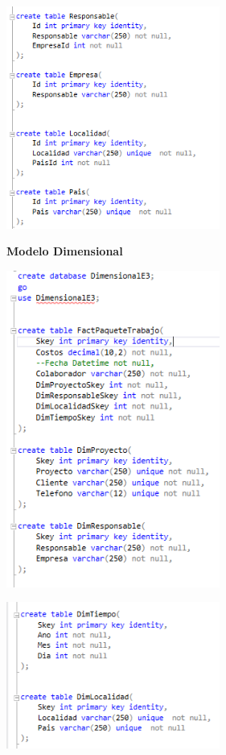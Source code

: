\begin{center}
\includegraphics[width=7cm]{./Imagenes/32}
\end{center}
\textbf{}
\textbf{Modelo Dimensional}
\begin{center}
\includegraphics[width=7cm]{./Imagenes/33}
\end{center}

\begin{center}
\includegraphics[width=7cm]{./Imagenes/34}
\end{center}


